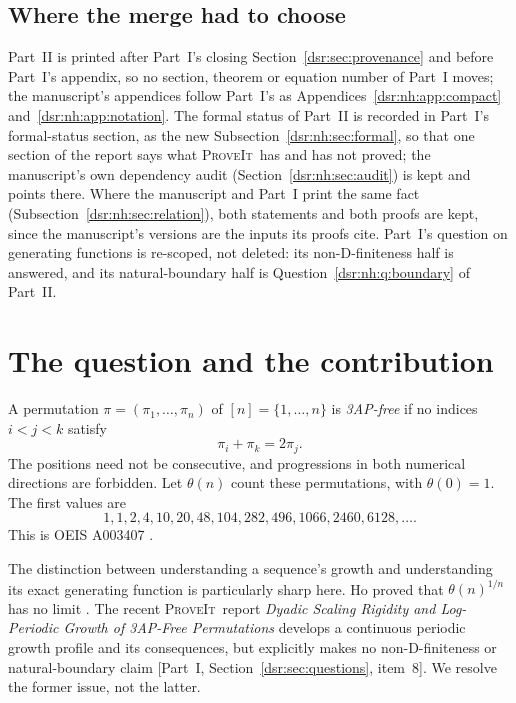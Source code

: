 \documentclass[11pt,a4paper]{article}
\numberwithin{equation}{section}
\theoremstyle{definition}
\theoremstyle{remark}
\newcommand{\repo}{\textsc{ProveIt}}
\newcommand{\tht}{\theta}
\newcommand{\partref}[1]{\textup{[}Part~I, #1\textup{]}}
\theoremstyle{definition}
\theoremstyle{plain}
\begin{document}
\subsection{Where the merge had to choose}
\label{dsr:nh:sec:choices}
Part~II is printed after Part~I's closing Section~\ref{dsr:sec:provenance}
and before Part~I's appendix, so no section, theorem or equation number of
Part~I moves; the manuscript's appendices follow Part~I's as
Appendices~\ref{dsr:nh:app:compact} and~\ref{dsr:nh:app:notation}. The
formal status of Part~II is recorded in Part~I's formal-status section, as
the new Subsection~\ref{dsr:nh:sec:formal}, so that one section of the
report says what \repo\ has and has not proved; the manuscript's own
dependency audit (Section~\ref{dsr:nh:sec:audit}) is kept and points
there. Where the manuscript and Part~I print the same fact
(Subsection~\ref{dsr:nh:sec:relation}), both statements and both proofs
are kept, since the manuscript's versions are the inputs its proofs cite.
Part~I's question on generating functions is re-scoped, not deleted: its
non-D-finiteness half is answered, and its natural-boundary half is
Question~\ref{dsr:nh:q:boundary} of Part~II.

\section{The question and the contribution}
\label{dsr:nh:sec:intro}
A permutation $\pi=(\pi_1,\ldots,\pi_n)$ of $[n]=\{1,\ldots,n\}$ is
\emph{3AP-free} if no indices $i<j<k$ satisfy
\begin{equation}
\pi_i+\pi_k=2\pi_j.
\label{dsr:nh:eq:avoid}
\end{equation}
The positions need not be consecutive, and progressions in both numerical
directions are forbidden. Let $\tht(n)$ count these permutations, with
$\tht(0)=1$. The first values are
\[
1,1,2,4,10,20,48,104,282,496,1066,2460,6128,\ldots.
\]
This is OEIS A003407 \cite{OEIS}.

The distinction between understanding a sequence's growth and understanding
its exact generating function is particularly sharp here. Ho proved that
$\tht(n)^{1/n}$ has no limit \cite{Ho}. The recent \repo\ report
\emph{Dyadic Scaling Rigidity and Log-Periodic Growth of 3AP-Free
Permutations} develops a continuous periodic growth profile and its
consequences, but explicitly makes no non-D-finiteness or natural-boundary
claim \partref{Section~\ref{dsr:sec:questions}, item~8}. We resolve the former issue, not the latter.
\end{document}

